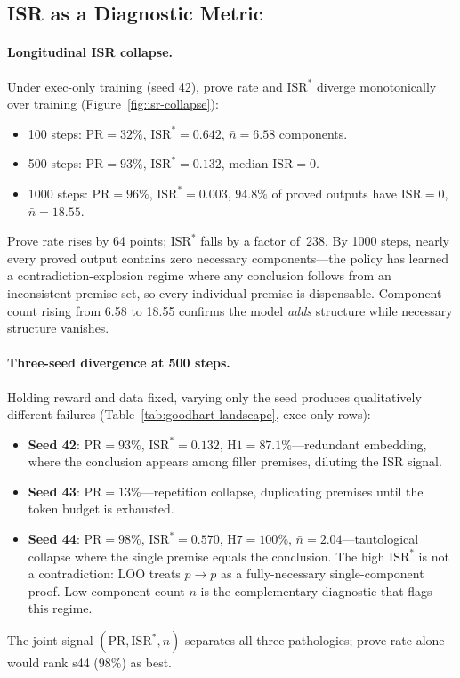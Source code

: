 \subsection{ISR as a Diagnostic Metric}
\label{sec:exp-diagnostic}

\paragraph{Longitudinal ISR collapse.}
Under exec-only training (seed 42), prove rate and $\mathrm{ISR}^*$ diverge monotonically over training (Figure~\ref{fig:isr-collapse}):
\begin{itemize}\itemsep0pt
  \item 100 steps: $\mathrm{PR}{=}32\%$, $\mathrm{ISR}^*{=}0.642$, $\bar{n}{=}6.58$ components.
  \item 500 steps: $\mathrm{PR}{=}93\%$, $\mathrm{ISR}^*{=}0.132$, median $\mathrm{ISR}{=}0$.
  \item 1000 steps: $\mathrm{PR}{=}96\%$, $\mathrm{ISR}^*{=}0.003$, $94.8\%$ of proved outputs have $\mathrm{ISR}{=}0$, $\bar{n}{=}18.55$.
\end{itemize}
Prove rate rises by 64 points; $\mathrm{ISR}^*$ falls by a factor of~238.
By 1000 steps, nearly every proved output contains zero necessary components---the policy has learned a contradiction-explosion regime where any conclusion follows from an inconsistent premise set, so every individual premise is dispensable.
Component count rising from 6.58 to 18.55 confirms the model \emph{adds} structure while necessary structure vanishes.

\paragraph{Three-seed divergence at 500 steps.}
Holding reward and data fixed, varying only the seed produces qualitatively different failures (Table~\ref{tab:goodhart-landscape}, exec-only rows):
\begin{itemize}\itemsep0pt
  \item \textbf{Seed 42}: $\mathrm{PR}{=}93\%$, $\mathrm{ISR}^*{=}0.132$, $\mathrm{H1}{=}87.1\%$---redundant embedding, where the conclusion appears among filler premises, diluting the ISR signal.
  \item \textbf{Seed 43}: $\mathrm{PR}{=}13\%$---repetition collapse, duplicating premises until the token budget is exhausted.
  \item \textbf{Seed 44}: $\mathrm{PR}{=}98\%$, $\mathrm{ISR}^*{=}0.570$, $\mathrm{H7}{=}100\%$, $\bar{n}{=}2.04$---tautological collapse where the single premise equals the conclusion. The high $\mathrm{ISR}^*$ is not a contradiction: LOO treats $p \to p$ as a fully-necessary single-component proof. Low component count $n$ is the complementary diagnostic that flags this regime.
\end{itemize}
The joint signal $(\mathrm{PR}, \mathrm{ISR}^*, n)$ separates all three pathologies; prove rate alone would rank s44 ($98\%$) as best.

